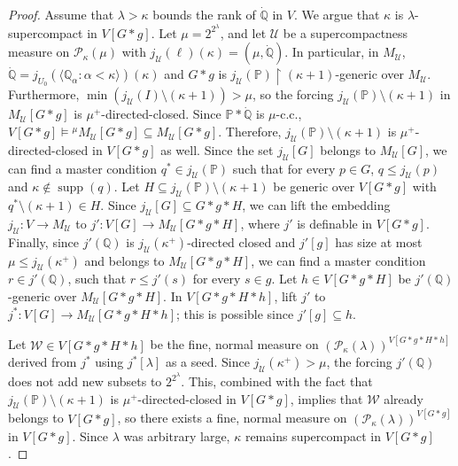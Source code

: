 \documentclass[11pt]{amsart}
\renewcommand{\restriction}{\mathbin\upharpoonright}    %
\theoremstyle{definition}
\newcounter{condition}
\theoremstyle{remark}
\newcommand\<{{<}}
\DeclareMathOperator{\supp}{supp}
\newcommand{\po}{\mathbb{P}}
\newcommand{\qo}{\mathbb{Q}}
\newcommand{\la}{\langle}
\newcommand{\ra}{\rangle}
\begin{document}
\begin{proof}
    Assume that $\lambda > \kappa$ bounds the rank of $\dot{\qo}$ in $V$. We argue that $\kappa$ is $\lambda$-supercompact in $V[G*g]$. Let $\mu = 2^{2^\lambda}$, and let  $\mathcal{U}$ be a supercompactness measure on $\mathcal{P}_{\kappa}(\mu)$ with $j_{\mathcal{U}}(\ell)(\kappa) = \left( \mu, \dot{\qo}\right)$. In particular, in $M_{\mathcal{U}}$, $\dot{\qo} = j_{U_0}(\la \qo_\alpha\colon \alpha<\kappa \ra)(\kappa)$ and $G*g$ is $j_{\mathcal{U}}(\po)\restriction (\kappa+1)$-generic over $M_{\mathcal{U}}$. 
    Furthermore, $\min(j_{\mathcal{U}}(I) \setminus (\kappa+1) )>\mu$, so the forcing $j_{\mathcal{U}}(\po)\setminus (\kappa+1)$ in $M_{\mathcal{U}}[G*g]$ is $\mu^{+}$-directed-closed. Since $\po*\dot{\qo}$ is $\mu$-c.c., $V[G*g]\vDash {}^\mu M_{\mathcal{U}}[G*g] \subseteq M_{\mathcal{U}}[G*g] $. Therefore,  $j_{\mathcal{U}}(\po)\setminus (\kappa+1)$ is $\mu^+$-directed-closed in $V[G*g]$ as well. Since the set $j_{\mathcal{U}}[G]$ belongs to $M_{\mathcal{U}}[G]$, we can find a master condition $q^*\in j_{\mathcal{U}}(\po)$ such that for every $p\in G$, $q\leq j_{\mathcal{U}}(p)$ and $\kappa\notin \supp(q)$. Let $H\subseteq j_{\mathcal{U}}(\po)\setminus (\kappa+1)$ be generic over $V[G*g]$ with $q^*\setminus(\kappa+1)\in H$. Since $j_{\mathcal{U}}[G]\subseteq G*g*H$, we can lift the embedding $j_{\mathcal{U}}\colon V\to M_{\mathcal{U}}$ to $j'\colon V[G]\to M_{\mathcal{U}}[G*g*H]$, where $j'$ is definable in $V[G*g]$. Finally, since $j'(\qo)$ is $j_{\mathcal{U}}(\kappa^+)$-directed closed and $j'[g]$ has size at most $\mu\leq j_{\mathcal{U}}(\kappa^+)$ and belongs to $M_{\mathcal{U}}[G*g*H]$, we can find a master condition $r\in j'(\qo)$, such that $r\leq j'(s)$ for every $s\in g$.  Let $h\in V[G*g*H]$ be $j'(\qo)$-generic over $M_{\mathcal{U}}[G*g*H]$. In $V[G*g*H*h]$, lift $j'$ to $j^*\colon V[G]\to M_{\mathcal{U}}[G*g*H*h]$; this is possible since $j'[g]\subseteq h$. 
    
    Let $\mathcal{W}\in V[G*g*H*h]$ be the fine, normal measure on $\left(\mathcal{P}_{\kappa}(\lambda)\right)^{V[G*g*H*h]}$ derived from $j^*$ using $j^*[\lambda]$ as a seed. Since $j_{\mathcal{U}}(\kappa^+) > \mu$, the forcing $j'(\qo)$ does not add new subsets to $2^{2^\lambda}$. This, combined with the fact that $j_{\mathcal{U}}(\po)\setminus (\kappa+1)$ is $\mu^+$-directed-closed in $V[G*g]$, implies that $\mathcal{W}$ already belongs to $V[G*g]$, so there exists a fine, normal measure on $\left(\mathcal{P}_{\kappa}(\lambda)\right)^{V[G*g]}$ in $V[G*g]$. Since $\lambda$ was arbitrary large, $\kappa$ remains supercompact in $V[G*g]$.


\end{proof}
\end{document}
